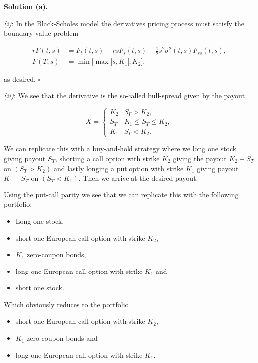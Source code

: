 \documentclass[
]{book}
\providecommand{\tightlist}{%
  \setlength{\itemsep}{0pt}\setlength{\parskip}{0pt}}
\begin{document}
\noindent\makebox[\linewidth]{\rule{\textwidth}{0.4pt}}

\textbf{Solution (a).}

\emph{(i)}: In the Black-Scholes model the derivatives pricing process must satisfy the boundary value problem

\begin{align*}
rF(t,s)&=F_t(t,s)+rsF_s(t,s)+\frac{1}{2}s^2\sigma^2(t,s)F_{ss}(t,s),\\
F(T,s)&=\min\Big[\max\Big[s,K_1\Big],K_2\Big].
\end{align*}

as desired. \(\square\)

\emph{(ii)}: We see that the derivative is the so-called bull-spread given by the payout

\[
X =
\begin{cases}
K_2 & S_T>K_2,\\
S_T & K_1\le S_T\le K_2,\\
K_1 & S_T<K_2.
\end{cases}
\]

We can replicate this with a buy-and-hold strategy where we long one stock giving payout \(S_T\), shorting a call option with strike \(K_2\) giving the payout \(K_2-S_T\) on \((S_T>K_2)\) and lastly longing a put option with strike \(K_1\) giving payout \(K_1-S_T\) on \((S_T<K_1)\). Then we arrive at the desired payout.

Using the put-call parity we see that we can replicate this with the following portfolio:

\begin{itemize}
\tightlist
\item
  Long one stock,
\item
  short one European call option with strike \(K_2\),
\item
  \(K_1\) zero-coupon bonds,
\item
  long one European call option with strike \(K_1\) and
\item
  short one stock.
\end{itemize}

Which obviously reduces to the portfolio

\begin{itemize}
\tightlist
\item
  short one European call option with strike \(K_2\),
\item
  \(K_1\) zero-coupon bonds and
\item
  long one European call option with strike \(K_1\).
\end{itemize}
\end{document}
